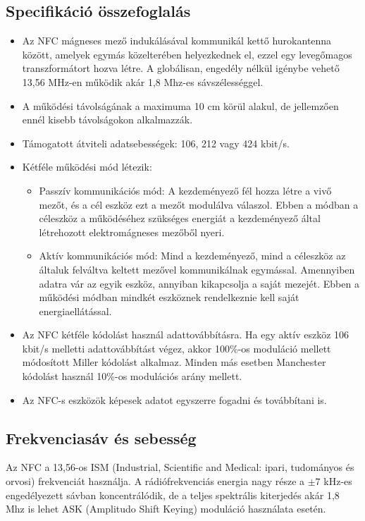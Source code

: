 \documentclass[12pt]{article}
\begin{document}
\subsection{Specifikáció összefoglalás}
\begin{itemize}
\item Az NFC mágneses mező indukálásával kommunikál kettő hurokantenna között,
amelyek egymás közelterében  helyezkednek el, ezzel egy levegőmagos
transzformátort hozva létre. A globálisan, engedély nélkül igénybe vehető 
13,56 MHz-en működik akár 1,8 Mhz-es sávszélességgel.
\item A működési távolságának a maximuma 10 cm körül alakul, de jellemzően ennél
kisebb távolságokon alkalmazzák.
\item Támogatott átviteli adatsebességek: 106, 212 vagy 424 kbit/s.
\item Kétféle működési mód létezik:
\begin{itemize}
\item Passzív kommunikációs mód: A kezdeményező fél hozza létre a vivő mezőt, és a
cél eszköz ezt a mezőt modulálva válaszol. Ebben a módban a céleszköz a 
működéséhez szükséges energiát a kezdeményező által létrehozott elektromágneses
mezőből nyeri.
\item Aktív kommunikációs mód: Mind a kezdeményező, mind a céleszköz az általuk
felváltva keltett mezővel kommunikálnak egymással. 
Amennyiben adatra vár az egyik eszköz,
annyiban kikapcsolja a saját mezejét. Ebben a működési módban mindkét eszköznek
rendelkeznie kell saját energiaellátással.
\end{itemize}
\item Az NFC kétféle kódolást használ adattovábbításra. Ha egy aktív eszköz 
106 kbit/s melletti adattovábbítást végez, akkor 100\%-os moduláció mellett
módosított Miller kódolást alkalmaz. Minden más esetben Manchester kódolást
használ 10\%-os modulációs arány mellett.
\item Az NFC-s eszközök képesek adatot egyszerre fogadni és továbbítani is. 
\end{itemize}

\subsection{Frekvenciasáv és sebesség}
Az NFC a 13,56-os ISM (Industrial, Scientific and Medical: ipari, tudományos
és orvosi) frekvenciát használja. A rádiófrekvenciás energia nagy része a 
$\pm 7$ kHz-es engedélyezett sávban koncentrálódik, de a teljes spektrális 
kiterjedés akár 1,8 Mhz is lehet ASK (Amplitudo Shift Keying)
moduláció használata esetén.
\end{document}
